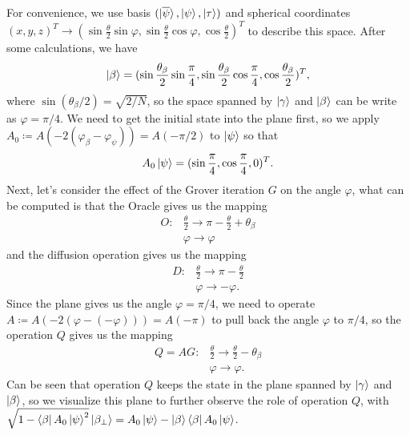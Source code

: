\documentclass[a4paper,10pt]{book}
\numberwithin{equation}{section}
\begin{document}
For convenience, we use basis $(\ket{\overline{\psi}},\ket{\psi},\ket{\tau})$ and spherical coordinates $(x,y,z)^{T}\to(\sin\frac{\theta}{2}\sin\varphi,\sin\frac{\theta}{2}\cos\varphi,\cos\frac{\theta}{2})^{T}$ to describe this space. After some calculations, we have
\begin{equation}
    \ket{\beta}=(\sin\frac{\theta_{\beta}}{2}\sin\frac{\pi}{4},\sin\frac{\theta_{\beta}}{2}\cos\frac{\pi}{4},\cos\frac{\theta_{\beta}}{2})^{T},
\end{equation}
where $\sin(\theta_{\beta}/2)=\sqrt{2/N}$, so the space spanned by $\ket{\gamma}$ and $\ket{\beta}$ can be write as $\varphi=\pi/4$. We need to get the initial state into the plane first, so we apply $A_{0}\coloneqq A(-2(\varphi_{\beta}-\varphi_{\psi}))=A(-\pi/2)$ to $\ket{\psi}$ so that
\begin{equation}
    A_{0}\ket{\psi}=(\sin\frac{\pi}{4},\cos\frac{\pi}{4},0)^{T}.
\end{equation}
Next, let's consider the effect of the Grover iteration $G$ on the angle $\varphi$, what can be computed is that the Oracle gives us the mapping
\begin{equation}
    \begin{split}
        O\colon & \frac{\theta}{2}\to\pi-\frac{\theta}{2}+\theta_{\beta} \\
                & \varphi\to\varphi
    \end{split}
\end{equation}
and the diffusion operation gives us the mapping
\begin{equation}
    \begin{split}
        D\colon & \frac{\theta}{2}\to\pi-\frac{\theta}{2} \\
                & \varphi\to-\varphi.
    \end{split}
\end{equation}
Since the plane gives us the angle $\varphi=\pi/4$, we need to operate $A\coloneqq A(-2(\varphi-(-\varphi)))=A(-\pi)$ to pull back the angle $\varphi$ to $\pi/4$, so the operation $Q$ gives us the mapping
\begin{equation}
    \begin{split}
        Q=AG\colon & \frac{\theta}{2}\to\frac{\theta}{2}-\theta_{\beta} \\
                   & \varphi\to\varphi.
    \end{split}
\end{equation}
Can be seen that operation $Q$ keeps the state in the plane spanned by $\ket{\gamma}$ and $\ket{\beta}$, so we visualize this plane to further observe the role of operation $Q$, with $\sqrt{1-\bra{\beta}A_{0}\ket{\psi}^{2}}\ket{\beta_{\perp}}=A_{0}\ket{\psi}-\ket{\beta}\bra{\beta}A_{0}\ket{\psi}$.
\end{document}
